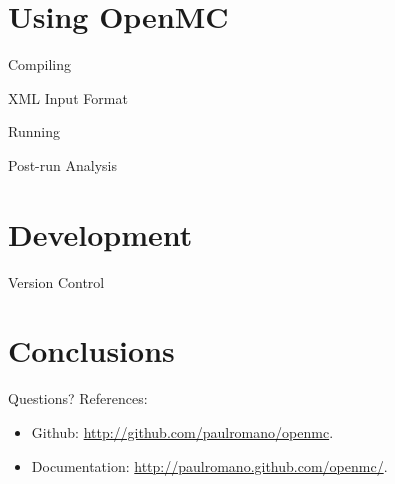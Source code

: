 \documentclass{beamer}
\begin{document}
\section{Using OpenMC}

\begin{frame}{Compiling}
\end{frame}

\begin{frame}{XML Input Format}
\end{frame}

\begin{frame}{Running}
\end{frame}

\begin{frame}{Post-run Analysis}
\end{frame}

\section{Development}

\begin{frame}{Version Control}
\end{frame}

\section{Conclusions}
\begin{frame}{Questions?}
  References:
  \begin{itemize}
    \item<1-> Github: \url{http://github.com/paulromano/openmc}.
    \item<1-> Documentation: \url{http://paulromano.github.com/openmc/}.
  \end{itemize}
\end{frame}
\end{document}

